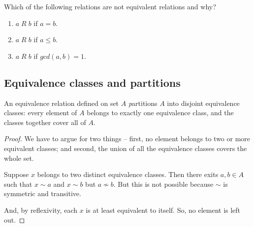 \begin{example}
\begin{enumerate}
\begin{center}
\end{center}
\end{enumerate}
\end{example}

\begin{exercise}
Which of the following relations are not equivalent relations and why?
\begin{enumerate}
\item $a\;R\;b$ if $a = b$.
\item $a\;R\;b$ if $a \leq b$.
\item $a\;R\;b$ if $gcd(a,b) = 1$.
\end{enumerate}
\end{exercise}

\subsection{Equivalence classes and partitions}
\label{sec:eq-classes}

\begin{theorem}
An equivalence relation defined on  set $A$  {\emph partitions} $A$ into disjoint equivalence classes: every element of $A$ belongs 
to exactly one equivalence class, and the classes together cover all of $A$.
\end{theorem}

\begin{proof}
We have to argue for two things -- first, no element belongs to two or more equivalent classes; and second, the union of all the equivalence classes covers the whole set.

Suppose $x$ belongs to two distinct equivalence classes. Then there exits $a,b \in A$ such that $x \sim a$ and $x \sim b$ but $a \not \sim b$. But this is not possible because $\sim$ is symmetric and transitive.

And, by reflexivity, each $x$ is at least equivalent to itself. So, no element is left out.
\end{proof}

